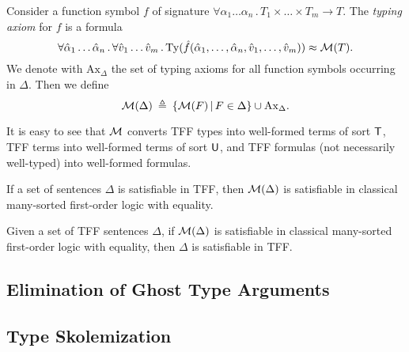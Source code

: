 Consider a function symbol $f$ of signature
$\forall \alpha_1\dots\alpha_n \,.\, T_1 \times \dots \times T_m \to T$.
The {\em typing axiom} for $f$ is a formula
$$
\forall \hat{\alpha}_1\dots\hat{\alpha}_n \,.\,
\forall \hat{v}_1\dots\hat{v}_m \,.\,
\mathrm{Ty}(\hat{f}(\hat{\alpha}_1,\dots,\hat{\alpha}_n,
\hat{v}_1,\dots,\hat{v}_m)) \approx \mathcal{M}(T).
$$
We denote with $\mathrm{Ax}_{\Delta}$ the set of typing axioms
for all function symbols occurring in $\Delta$. Then we define
$$
\mathcal{M}(\Delta) \:\triangleq\: \{ \mathcal{M}(F) \operatorname{|} F \in \Delta \} \cup
\mathrm{Ax}_{\Delta}.
$$

It is easy to see that $\mathcal{M}$ converts TFF types into well-formed
terms of sort $\mathsf{T}$, TFF terms into well-formed terms of sort $\mathsf{U}$,
and TFF formulas (not necessarily well-typed) into well-formed formulas.

\begin{theorem} \label{thm:mon_sound}
If a set of sentences $\Delta$ is satisfiable in TFF,
then $\mathcal{M}(\Delta)$ is satisfiable in classical
many-sorted first-order logic with equality.
\end{theorem}

\begin{theorem} \label{thm:mon_compl}
Given a set of TFF sentences $\Delta$, if $\mathcal{M}(\Delta)$
is satisfiable in classical many-sorted first-order logic
with equality, then $\Delta$ is satisfiable in TFF.
\end{theorem}

\subsection{Elimination of Ghost Type Arguments} \label{ssec:ghost}
\subsection{Type Skolemization} \label{ssec:skol}


